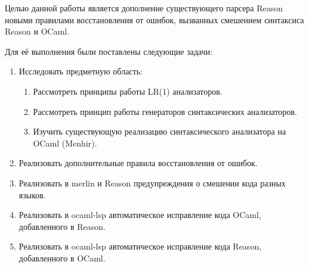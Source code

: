 Целью данной работы является дополнение существующего парсера Reason новыми правилами восстановления от ошибок, вызванных смешением синтаксиса Reason и OCaml.

Для её выполнения были поставлены следующие задачи:
 \begin{enumerate}
 \item Исследовать предметную область:
 \begin{enumerate} 
 	\item Рассмотреть принципы работы LR(1) анализаторов.
	\item Рассмотреть принцип работы генераторов синтаксических анализаторов.
 	\item Изучить существующую реализацию синтаксического анализатора на OCaml (Menhir).
 \end{enumerate}
 \item Реализовать дополнительные правила восстановления от ошибок.
 \item Реализовать в merlin и Reason предупреждения о смешении кода разных языков.
 \item Реализовать в ocaml-lsp автоматическое исправление кода OCaml, добавленного в Reason.
 \item Реализовать в ocaml-lsp автоматическое исправление кода Reason, добавленного в OCaml.
 
 \end{enumerate}
